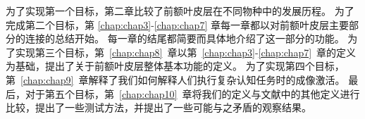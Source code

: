 \par

为了实现第一个目标，第二章比较了前额叶皮层在不同物种中的发展历程。
为了完成第二个目标，第 \ref{chap:chap3}-\ref{chap:chap7} 章每一章都以对前额叶皮层主要部分的连接的总结开始。
每一章的结尾都简要而具体地介绍了这一部分的功能。
为了实现第三个目标，第~\ref{chap:chap8}~章以第~\ref{chap:chap3}-\ref{chap:chap7}~章的定义为基础，提出了关于前额叶皮层整体基本功能的定义。
为了实现第四个目标，第~\ref{chap:chap9}~章解释了我们如何解释人们执行复杂认知任务时的成像激活。
最后，对于第五个目标，第~\ref{chap:chap10}~章将我们的定义与文献中的其他定义进行比较，提出了一些测试方法，并提出了一些可能与之矛盾的观察结果。



